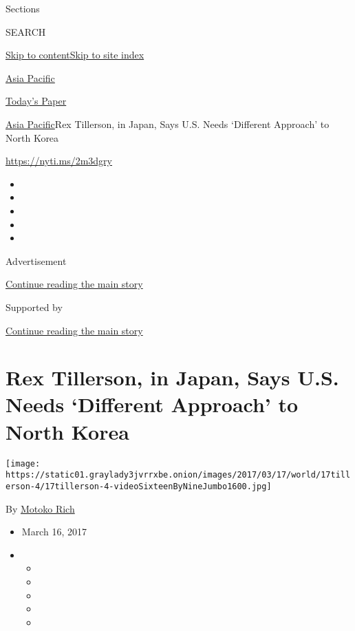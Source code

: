 Sections

SEARCH

\protect\hyperlink{site-content}{Skip to
content}\protect\hyperlink{site-index}{Skip to site index}

\href{https://www.nytimes3xbfgragh.onion/section/world/asia}{Asia
Pacific}

\href{https://myaccount.nytimes3xbfgragh.onion/auth/login?response_type=cookie\&client_id=vi}{}

\href{https://www.nytimes3xbfgragh.onion/section/todayspaper}{Today's
Paper}

\href{/section/world/asia}{Asia Pacific}\textbar{}Rex Tillerson, in
Japan, Says U.S. Needs `Different Approach' to North Korea

\url{https://nyti.ms/2m3dgry}

\begin{itemize}
\item
\item
\item
\item
\item
\end{itemize}

Advertisement

\protect\hyperlink{after-top}{Continue reading the main story}

Supported by

\protect\hyperlink{after-sponsor}{Continue reading the main story}

\hypertarget{rex-tillerson-in-japan-says-us-needs-different-approach-to-north-korea}{%
\section{Rex Tillerson, in Japan, Says U.S. Needs `Different Approach'
to North
Korea}\label{rex-tillerson-in-japan-says-us-needs-different-approach-to-north-korea}}

\texttt{[image: https://static01.graylady3jvrrxbe.onion/images/2017/03/17/world/17tillerson-4/17tillerson-4-videoSixteenByNineJumbo1600.jpg]}

By \href{http://www.nytimes3xbfgragh.onion/by/motoko-rich}{Motoko Rich}

\begin{itemize}
\item
  March 16, 2017
\item
  \begin{itemize}
  \item
  \item
  \item
  \item
  \item
  \end{itemize}
\end{itemize}

